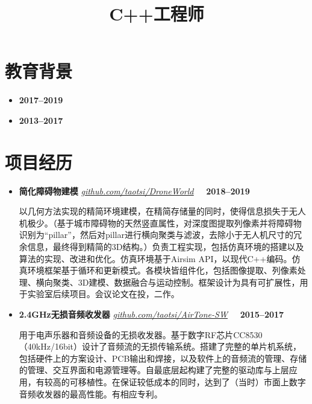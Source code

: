 \documentclass[11pt,a4paper,sans]{moderncv}        %
\title{\yahei \LARGE C++工程师}
\begin{document}
\makecvtitle

\vspace{-30pt}

\section{\yahei 教育背景}

\begin{itemize}

	\item{\hfill\textbf{2017--2019}}

	\item{\hfill\textbf{2013--2017}}

\end{itemize}

\vspace{-6pt}

\section{\yahei 项目经历}

\begin{itemize}

	\item{\textbf{\yahei 简化障碍物建模}
	      \hfill{\href{https://github.com/taotsi/DroneWorld}
		      {\footnotesize\underline{\emph{github.com/taotsi/DroneWorld}}}
		      \textbf{\ \ 2018--2019}}}

	      \vspace{2pt}

	      {\small\yahei 以几何方法实现的精简环境建模，在精简存储量的同时，使得信息损失于无人机极少。（基于城市障碍物的天然竖直属性，对深度图提取列像素并将障碍物识别为“pillar”，然后对pillar进行横向聚类与滤波，去除小于无人机尺寸的冗余信息，最终得到精简的3D结构。）负责工程实现，包括仿真环境的搭建以及算法的实现、改进和优化。仿真环境基于Airsim API，以现代C++编码。仿真环境框架基于循环和更新模式。各模块皆组件化，包括图像提取、列像素处理、横向聚类、3D建模、数据融合与运动控制。框架设计为具有可扩展性，用于实验室后续项目。会议论文在投，二作。}

	      \vspace{3pt}

	\item{\textbf{\yahei 2.4GHz无损音频收发器}
	      \hfill{\href{https://github.com/taotsi/AirTone-SW}
		      {\footnotesize\underline{\emph{github.com/taotsi/AirTone-SW}}}
		      \textbf{\ \ 2015--2017}}}

	      \vspace{2pt}

	      {\small\yahei 用于电声乐器和音频设备的无损收发器。基于数字RF芯片CC8530（40kHz/16bit）设计了音频流的无损传输系统。搭建了完整的单片机系统，包括硬件上的方案设计、PCB输出和焊接，以及软件上的音频流的管理、存储的管理、交互界面和电源管理等。自最底层起构建了完整的驱动库与上层应用，有较高的可移植性。在保证较低成本的同时，达到了（当时）市面上数字音频收发器的最高性能。有相应专利。}

\end{itemize}
\end{document}
